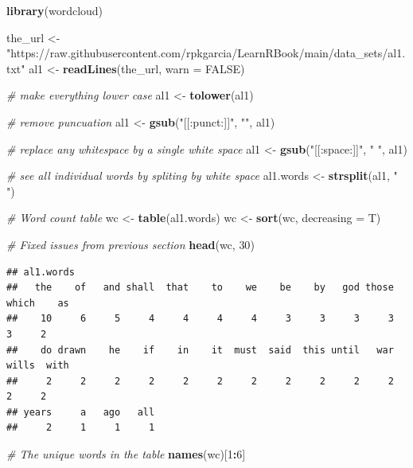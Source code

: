 \documentclass[
]{book}
\newenvironment{Shaded}{\begin{snugshade}}{\end{snugshade}}
\newcommand{\CommentTok}[1]{\textcolor[rgb]{0.56,0.35,0.01}{\textit{#1}}}
\newcommand{\DataTypeTok}[1]{\textcolor[rgb]{0.13,0.29,0.53}{#1}}
\newcommand{\DecValTok}[1]{\textcolor[rgb]{0.00,0.00,0.81}{#1}}
\newcommand{\KeywordTok}[1]{\textcolor[rgb]{0.13,0.29,0.53}{\textbf{#1}}}
\newcommand{\NormalTok}[1]{#1}
\newcommand{\OperatorTok}[1]{\textcolor[rgb]{0.81,0.36,0.00}{\textbf{#1}}}
\newcommand{\OtherTok}[1]{\textcolor[rgb]{0.56,0.35,0.01}{#1}}
\newcommand{\StringTok}[1]{\textcolor[rgb]{0.31,0.60,0.02}{#1}}
\begin{document}
\begin{Shaded}
\begin{Highlighting}[]
\KeywordTok{library}\NormalTok{(wordcloud)}

\NormalTok{the_url <-}\StringTok{ "https://raw.githubusercontent.com/rpkgarcia/LearnRBook/main/data_sets/al1.txt"}
\NormalTok{al1 <-}\StringTok{ }\KeywordTok{readLines}\NormalTok{(the_url, }\DataTypeTok{warn =} \OtherTok{FALSE}\NormalTok{)}

\CommentTok{# make everything lower case}
\NormalTok{al1 <-}\StringTok{ }\KeywordTok{tolower}\NormalTok{(al1)}

\CommentTok{# remove puncuation}
\NormalTok{al1 <-}\StringTok{ }\KeywordTok{gsub}\NormalTok{(}\StringTok{"[[:punct:]]"}\NormalTok{, }\StringTok{""}\NormalTok{, al1)}

\CommentTok{# replace any whitespace by a single white space}
\NormalTok{al1 <-}\StringTok{ }\KeywordTok{gsub}\NormalTok{(}\StringTok{"[[:space:]]"}\NormalTok{, }\StringTok{" "}\NormalTok{, al1)}

\CommentTok{# see all individual words by spliting by white space}
\NormalTok{al1.words <-}\StringTok{ }\KeywordTok{strsplit}\NormalTok{(al1, }\StringTok{" "}\NormalTok{)}

\CommentTok{# Word count table}
\NormalTok{wc <-}\StringTok{ }\KeywordTok{table}\NormalTok{(al1.words)}
\NormalTok{wc <-}\StringTok{ }\KeywordTok{sort}\NormalTok{(wc, }\DataTypeTok{decreasing =}\NormalTok{ T)}

\CommentTok{# Fixed issues from previous section}
\KeywordTok{head}\NormalTok{(wc, }\DecValTok{30}\NormalTok{)}
\end{Highlighting}
\end{Shaded}

\begin{verbatim}
## al1.words
##   the    of   and shall  that    to    we    be    by   god those which    as 
##    10     6     5     4     4     4     4     3     3     3     3     3     2 
##    do drawn    he    if    in    it  must  said  this until   war wills  with 
##     2     2     2     2     2     2     2     2     2     2     2     2     2 
## years     a   ago   all 
##     2     1     1     1
\end{verbatim}

\begin{Shaded}
\begin{Highlighting}[]
\CommentTok{# The unique words in the table}
\KeywordTok{names}\NormalTok{(wc)[}\DecValTok{1}\OperatorTok{:}\DecValTok{6}\NormalTok{]}
\end{Highlighting}
\end{Shaded}
\end{document}
